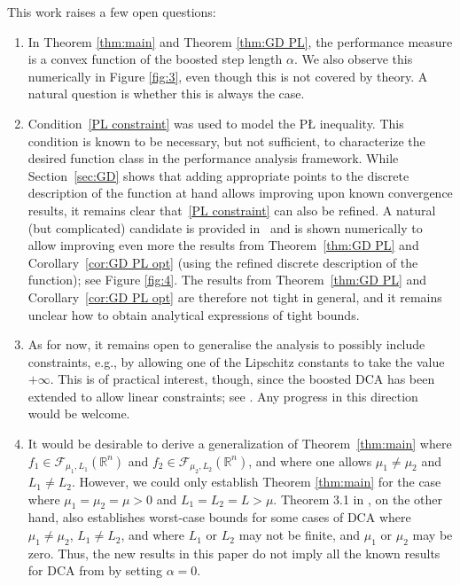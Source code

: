 \documentclass{article} %
\begin{document}
This work raises a few open questions:
\begin{enumerate}
  \item
  In Theorem \ref{thm:main} and Theorem \ref{thm:GD PL}, the performance measure is a convex function of the boosted step length $\alpha$.
  We also observe this numerically in Figure \ref{fig:3}, even though this is not covered by theory. A natural question is whether this is always the case.
  \item
  Condition~\eqref{PL constraint} was used to model the P{\L} inequality. This condition is known to
  be necessary, but not sufficient, to characterize the desired function class in the performance analysis framework.
   While Section~\ref{sec:GD} shows that adding appropriate points to the discrete description of the function at hand
   allows improving upon known convergence results, it remains clear that~\eqref{PL constraint} can also
    be refined. A natural (but complicated) candidate is provided in~\cite[Proposition 3.4]{rubbens2025constructive}
    and is shown numerically to allow improving even more the results from Theorem~\ref{thm:GD PL} and Corollary~\ref{cor:GD PL opt}
     (using the refined discrete description of the function); see Figure \ref{fig:4}. The results from Theorem~\ref{thm:GD PL} and Corollary~\ref{cor:GD PL opt} are therefore not tight in general, and it remains unclear how to obtain analytical expressions of tight bounds.
  \item As for now, it remains open to generalise the analysis to possibly include constraints,
  e.g., by allowing one of the Lipschitz constants to take the value $+\infty$. This is of practical interest, though, since the boosted DCA has been extended to allow linear constraints; see \cite{Boosted_DCA_linear_constraints,Zhang_et_al_2024_JOTA}. Any progress in this direction would be welcome.
  \item 
 { It would be desirable to derive a generalization of Theorem~\ref{thm:main} where  $f_1\in\mathcal{F}_{\mu_1, L_1}({\mathbb{R}^n})$ and $f_2\in\mathcal{F}_{\mu_2, L_2}({\mathbb{R}^n})$, and where one allows $\mu_1 \ne \mu_2$ and $L_1 \neq L_2$.
However, we could only establish Theorem \ref{thm:main} for the case where $\mu_1 = \mu_2 = \mu > 0$ and $L_1 = L_2 = L > \mu$. Theorem 3.1 in \cite{abbaszad2024DCA}, on the other hand, also establishes worst-case bounds for some cases of DCA where $\mu_1 \neq \mu_2$, $L_1 \neq L_2$, and where $L_1$ or $L_2$ may  not be finite, and $\mu_1$ or $\mu_2$ may be zero. Thus, the new results in this paper do not imply all the known results for DCA from \cite{abbaszad2024DCA} by setting $\alpha = 0$. 
}
\end{enumerate}
\end{document}
